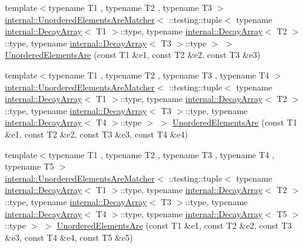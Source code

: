 \begin{DoxyCompactItemize}
\item 
{\footnotesize template$<$typename T1 , typename T2 , typename T3 $>$ }\\\hyperlink{classtesting_1_1internal_1_1_unordered_elements_are_matcher}{internal\+::\+Unordered\+Elements\+Are\+Matcher}$<$ \+::testing\+::tuple$<$ typename \hyperlink{structtesting_1_1internal_1_1_decay_array}{internal\+::\+Decay\+Array}$<$ T1 $>$\+::type, typename \hyperlink{structtesting_1_1internal_1_1_decay_array}{internal\+::\+Decay\+Array}$<$ T2 $>$\+::type, typename \hyperlink{structtesting_1_1internal_1_1_decay_array}{internal\+::\+Decay\+Array}$<$ T3 $>$\+::type $>$ $>$ \hyperlink{namespacetesting_aec0f9ede2dc05de791c61eae0504a757}{Unordered\+Elements\+Are} (const T1 \&e1, const T2 \&e2, const T3 \&e3)
\item 
{\footnotesize template$<$typename T1 , typename T2 , typename T3 , typename T4 $>$ }\\\hyperlink{classtesting_1_1internal_1_1_unordered_elements_are_matcher}{internal\+::\+Unordered\+Elements\+Are\+Matcher}$<$ \+::testing\+::tuple$<$ typename \hyperlink{structtesting_1_1internal_1_1_decay_array}{internal\+::\+Decay\+Array}$<$ T1 $>$\+::type, typename \hyperlink{structtesting_1_1internal_1_1_decay_array}{internal\+::\+Decay\+Array}$<$ T2 $>$\+::type, typename \hyperlink{structtesting_1_1internal_1_1_decay_array}{internal\+::\+Decay\+Array}$<$ T3 $>$\+::type, typename \hyperlink{structtesting_1_1internal_1_1_decay_array}{internal\+::\+Decay\+Array}$<$ T4 $>$\+::type $>$ $>$ \hyperlink{namespacetesting_a8dfb2b88d0cacb8ececc069b0b015991}{Unordered\+Elements\+Are} (const T1 \&e1, const T2 \&e2, const T3 \&e3, const T4 \&e4)
\item 
{\footnotesize template$<$typename T1 , typename T2 , typename T3 , typename T4 , typename T5 $>$ }\\\hyperlink{classtesting_1_1internal_1_1_unordered_elements_are_matcher}{internal\+::\+Unordered\+Elements\+Are\+Matcher}$<$ \+::testing\+::tuple$<$ typename \hyperlink{structtesting_1_1internal_1_1_decay_array}{internal\+::\+Decay\+Array}$<$ T1 $>$\+::type, typename \hyperlink{structtesting_1_1internal_1_1_decay_array}{internal\+::\+Decay\+Array}$<$ T2 $>$\+::type, typename \hyperlink{structtesting_1_1internal_1_1_decay_array}{internal\+::\+Decay\+Array}$<$ T3 $>$\+::type, typename \hyperlink{structtesting_1_1internal_1_1_decay_array}{internal\+::\+Decay\+Array}$<$ T4 $>$\+::type, typename \hyperlink{structtesting_1_1internal_1_1_decay_array}{internal\+::\+Decay\+Array}$<$ T5 $>$\+::type $>$ $>$ \hyperlink{namespacetesting_a5e0ff76eb3f61b6c79b60311ceca73d3}{Unordered\+Elements\+Are} (const T1 \&e1, const T2 \&e2, const T3 \&e3, const T4 \&e4, const T5 \&e5)

\end{DoxyCompactItemize}
